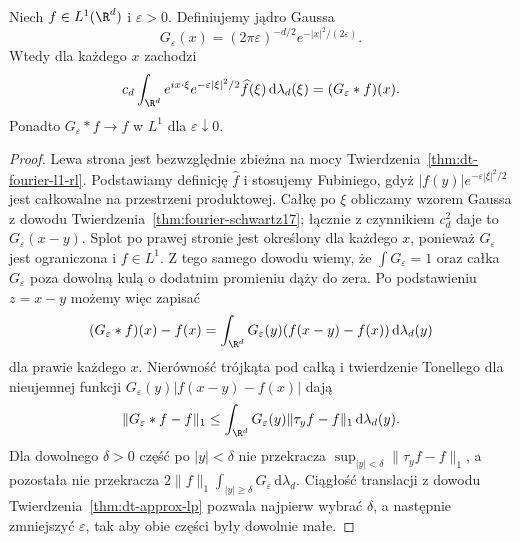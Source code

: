 \begin{lemat}
\label{lem:dt-fourier-gaussian-l1}
Niech $f\in L^1(\R^d)$ i $\varepsilon>0$.
Definiujemy jądro Gaussa
\[
 G_\varepsilon(x)=(2\pi\varepsilon)^{-d/2}
 e^{-|x|^2/(2\varepsilon)}.
\]
Wtedy dla każdego $x$ zachodzi
\[
 c_d\int_{\R^d}e^{ix\cdot\xi}
 e^{-\varepsilon|\xi|^2/2}\widehat f(\xi)
 \,\mathrm d\lambda_d(\xi)=(G_\varepsilon*f)(x).
\]
Ponadto $G_\varepsilon*f\to f$ w $L^1$ dla
$\varepsilon\downarrow0$.
\end{lemat}
\begin{proof}
Lewa strona jest bezwzględnie zbieżna na mocy
Twierdzenia~\ref{thm:dt-fourier-l1-rl}.
Podstawiamy definicję $\widehat f$ i stosujemy Fubiniego,
gdyż $|f(y)|e^{-\varepsilon|\xi|^2/2}$ jest całkowalne
na przestrzeni produktowej. Całkę po $\xi$ obliczamy
wzorem Gaussa z dowodu Twierdzenia~\ref{thm:fourier-schwartz17};
łącznie z czynnikiem $c_d^2$ daje to $G_\varepsilon(x-y)$.
Splot po prawej stronie jest określony dla każdego $x$,
ponieważ $G_\varepsilon$ jest ograniczona i $f\in L^1$.
Z tego samego dowodu wiemy, że $\int G_\varepsilon=1$
oraz całka $G_\varepsilon$ poza dowolną kulą o dodatnim
promieniu dąży do zera. Po podstawieniu $z=x-y$
możemy więc zapisać
\[
 (G_\varepsilon*f)(x)-f(x)=
 \int_{\R^d}G_\varepsilon(y)(f(x-y)-f(x))\,\mathrm d\lambda_d(y)
\]
dla prawie każdego $x$.
Nierówność trójkąta pod całką i twierdzenie Tonellego
dla nieujemnej funkcji
$G_\varepsilon(y)|f(x-y)-f(x)|$ dają
\[
 \|G_\varepsilon*f-f\|_1
 \le \int_{\R^d}G_\varepsilon(y)
 \|\tau_yf-f\|_1\,\mathrm d\lambda_d(y).
\]
Dla dowolnego $\delta>0$ część po $|y|<\delta$ nie
przekracza $\sup_{|y|<\delta}\|\tau_yf-f\|_1$,
a pozostała nie przekracza
$2\|f\|_1\int_{|y|\ge\delta}G_\varepsilon\,\mathrm d\lambda_d$.
Ciągłość translacji z dowodu Twierdzenia~\ref{thm:dt-approx-lp}
pozwala najpierw wybrać $\delta$,
a następnie zmniejszyć $\varepsilon$, tak aby obie
części były dowolnie małe.
\end{proof}

